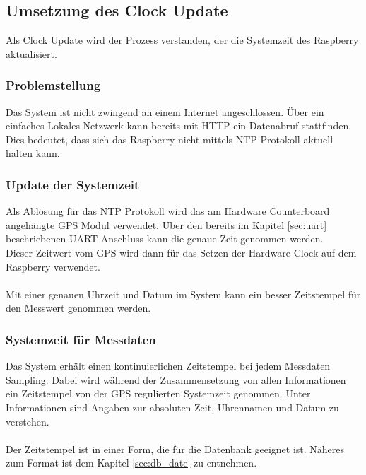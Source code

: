 \subsection{Umsetzung des Clock Update}%
Als Clock Update wird der Prozess verstanden, der die Systemzeit des Raspberry aktualisiert.

\subsubsection{Problemstellung}
Das System ist nicht zwingend an einem Internet angeschlossen. Über ein einfaches Lokales Netzwerk kann bereits mit HTTP ein Datenabruf stattfinden. Dies bedeutet, dass sich das Raspberry nicht mittels NTP Protokoll aktuell halten kann.

\subsubsection{Update der Systemzeit}
Als Ablösung für das NTP Protokoll wird das am Hardware Counterboard angehängte GPS Modul verwendet. Über den bereits im Kapitel \ref{sec:uart} beschriebenen UART Anschluss kann die genaue Zeit genommen werden.\\
Dieser Zeitwert vom GPS wird dann für das Setzen der Hardware Clock auf dem Raspberry verwendet.\\
\\
Mit einer genauen Uhrzeit und Datum im System kann ein besser Zeitstempel für den Messwert genommen werden. 

\subsubsection{Systemzeit für Messdaten}
Das System erhält einen kontinuierlichen Zeitstempel bei jedem Messdaten Sampling. Dabei wird während der Zusammensetzung von allen Informationen ein Zeitstempel von der GPS regulierten Systemzeit genommen. Unter Informationen sind Angaben zur absoluten Zeit, Uhrennamen und Datum zu verstehen.\\
\\
Der Zeitstempel ist in einer Form, die für die Datenbank geeignet ist. Näheres zum Format ist dem Kapitel \ref{sec:db_date} zu entnehmen.